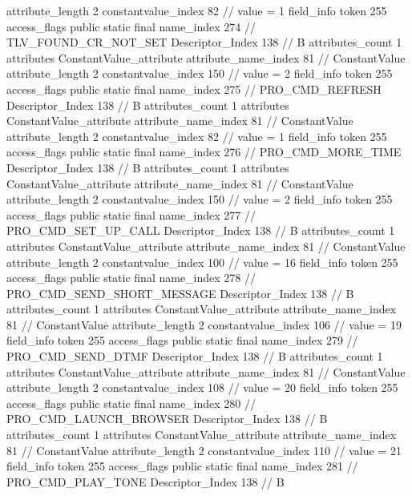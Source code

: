 {{{{{{{					attribute_length	2
					constantvalue_index	82		// value = 1
				}
				}
			}
			field_info {
				token	255
				access_flags	public static final
				name_index	274		// TLV_FOUND_CR_NOT_SET
				Descriptor_Index	138		// B
				attributes_count	1
				attributes {
				ConstantValue_attribute {
					attribute_name_index	81		// ConstantValue
					attribute_length	2
					constantvalue_index	150		// value = 2
				}
				}
			}
			field_info {
				token	255
				access_flags	public static final
				name_index	275		// PRO_CMD_REFRESH
				Descriptor_Index	138		// B
				attributes_count	1
				attributes {
				ConstantValue_attribute {
					attribute_name_index	81		// ConstantValue
					attribute_length	2
					constantvalue_index	82		// value = 1
				}
				}
			}
			field_info {
				token	255
				access_flags	public static final
				name_index	276		// PRO_CMD_MORE_TIME
				Descriptor_Index	138		// B
				attributes_count	1
				attributes {
				ConstantValue_attribute {
					attribute_name_index	81		// ConstantValue
					attribute_length	2
					constantvalue_index	150		// value = 2
				}
				}
			}
			field_info {
				token	255
				access_flags	public static final
				name_index	277		// PRO_CMD_SET_UP_CALL
				Descriptor_Index	138		// B
				attributes_count	1
				attributes {
				ConstantValue_attribute {
					attribute_name_index	81		// ConstantValue
					attribute_length	2
					constantvalue_index	100		// value = 16
				}
				}
			}
			field_info {
				token	255
				access_flags	public static final
				name_index	278		// PRO_CMD_SEND_SHORT_MESSAGE
				Descriptor_Index	138		// B
				attributes_count	1
				attributes {
				ConstantValue_attribute {
					attribute_name_index	81		// ConstantValue
					attribute_length	2
					constantvalue_index	106		// value = 19
				}
				}
			}
			field_info {
				token	255
				access_flags	public static final
				name_index	279		// PRO_CMD_SEND_DTMF
				Descriptor_Index	138		// B
				attributes_count	1
				attributes {
				ConstantValue_attribute {
					attribute_name_index	81		// ConstantValue
					attribute_length	2
					constantvalue_index	108		// value = 20
				}
				}
			}
			field_info {
				token	255
				access_flags	public static final
				name_index	280		// PRO_CMD_LAUNCH_BROWSER
				Descriptor_Index	138		// B
				attributes_count	1
				attributes {
				ConstantValue_attribute {
					attribute_name_index	81		// ConstantValue
					attribute_length	2
					constantvalue_index	110		// value = 21
				}
				}
			}
			field_info {
				token	255
				access_flags	public static final
				name_index	281		// PRO_CMD_PLAY_TONE
				Descriptor_Index	138		// B
}}}}}
